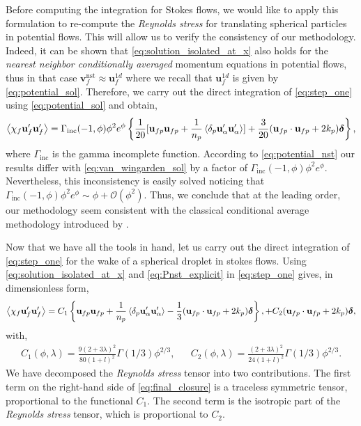 Before computing the integration for Stokes flows, we would like to apply this formulation to re-compute the \textit{Reynolds stress} for translating spherical particles in potential flows. 
This will allow us to verify the consistency of our methodology. 
Indeed, it can be shown that \ref{eq:solution_isolated_at_x} also holds for the \textit{nearest neighbor conditionally averaged} momentum equations in potential flows, thus in that case $\textbf{v}^\text{nst}_f \approx \textbf{u}_f^{1d}$ where we recall that $ \textbf{u}_f^{1d}$ is given by \ref{eq:potential_sol}.
Therefore, we carry out the direct integration of \ref{eq:step_one} using \ref{eq:potential_sol} and obtain, 
\begin{equation}
    \avg{\chi_f \textbf{u}_f'\textbf{u}_f'}
    = \Gamma_\text{inc}(-1,\phi)\phi^2 e^\phi \left\{
        \frac{1}{20}[\textbf{u}_{fp}\textbf{u}_{fp}+ \frac{1}{n_p}\pavg{\textbf{u}_\alpha'\textbf{u}_\alpha'}]
        + 
        \frac{3}{20} (\textbf{u}_{fp}\cdot \textbf{u}_{fp} + 2k_p)\bm\delta
    \right\},
    \label{eq:potential_nst}
\end{equation}
where $\Gamma_\text{inc}$ is the gamma incomplete function. 
According to \ref{eq:potential_nst} our results differ with \ref{eq:van_wingarden_sol} by a factor of $\Gamma_\text{inc}(-1,\phi)\phi^2 e^\phi$. 
Nevertheless, this inconsistency is easily solved noticing that $\Gamma_\text{inc}(-1,\phi)\phi^2 e^\phi \sim \phi + \mathcal{O}(\phi^2)$. 
Thus, we conclude that at the leading order, our methodology seem consistent with the classical conditional average methodology introduced by \citet{batchelor1972sedimentation}. 

Now that we have all the tools in hand, let us carry out the direct integration of \ref{eq:step_one} for the wake of a spherical droplet in stokes flows. 
Using \ref{eq:solution_isolated_at_x} and \ref{eq:Pnst_explicit} in \ref{eq:step_one} gives, in dimensionless form,  
\begin{equation}
    \avg{\chi_f  \textbf{u}_f'\textbf{u}_f'}
    = 
    C_1
    \left\{
        \textbf{u}_{fp}\textbf{u}_{fp}+ \frac{1}{n_p}\pavg{\textbf{u}_\alpha'\textbf{u}_\alpha'}
        -\frac{1}{3} (\textbf{u}_{fp}\cdot \textbf{u}_{fp} + 2k_p)\bm\delta
    \right\},    
    +  C_2
    (\textbf{u}_{fp}\cdot \textbf{u}_{fp} + 2k_p)\bm\delta,
    \label{eq:final_closure}
\end{equation}
with,
\begin{align*}
    C_1(\phi,\lambda)
    = \frac{9(2+3\lambda)^2}{80(1+l)^2}
        \Gamma(1/3) \phi^{2/3}
    ,
    &&
    C_2(\phi,\lambda)
    = \frac{(2+3\lambda)^2}{24(1+l)^2}
        \Gamma(1/3) \phi^{2/3}.
\end{align*}
We have decomposed the \textit{Reynolds stress} tensor into two contributions. 
The first term on the right-hand side of \ref{eq:final_closure} is a traceless symmetric tensor, proportional to the functional $C_1$. 
The second term is the isotropic part of the \textit{Reynolds stress} tensor, which is proportional to $C_2$. 

